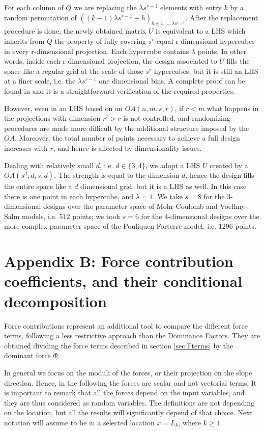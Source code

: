 \documentclass{article}
\begin{document}
For each column of $Q$ we are replacing the $\lambda s^{r-1}$ elements with entry $k$ by a random permutation of $\left((k-1)\lambda s^{r-1} + h\right)_{h\in 1,\dots, \lambda s^{r-1}}$. After the replacement procedure is done, the newly obtained matrix $U$ is equivalent to a LHS which inherits from $Q$ the property of fully covering $s^r$ equal r-dimensional hypercubes in every r-dimensional projection. Each hypercube contains $\lambda$ points. In other words, inside each r-dimensional projection, the design associated to $U$ fills the space like a regular grid at the scale of those $s^r$ hypercubes, but it is still an LHS at a finer scale, i.e. the $\lambda s^{r-1}$ one dimensional bins. A complete proof can be found in \cite{Tang1993} and it is a straightforward verification of the required properties.

However, even in an LHS based on an $OA(n,m,s,r)$, if $r<m$ what happens in the projections with dimension $r'>r$ is not controlled, and randomizing procedures are made more difficult by the additional structure imposed by the $OA$. Moreover, the total number of points necessary to achieve a full design increases with $r$, and hence is affected by dimensionality issues.

Dealing with relatively small $d$, i.e. $d\in\{3,4\}$, we adopt a LHS $U$ created by a $OA(s^d,d,s,d)$. The strength is equal to the dimension $d$, hence the design fills the entire space like a $d$ dimensional grid, but it is a LHS as well. In this case there is one point in each hypercube, and $\lambda=1$. We take $s=8$ for the 3-dimensional designs over the parameter space of Mohr-Coulomb and Voellmy-Salm models, i.e. $512$ points; we took $s=6$ for the 4-dimensional designs over the more complex parameter space of the Pouliquen-Forterre model, i.e. 1296 points.

\section{Appendix B: Force contribution coefficients, and their conditional decomposition}
Force contributions represent an additional tool to compare the different force terms, following a less restrictive approach than the Dominance Factors. They are obtained dividing the force terms described in section \ref{sec:Fterms} by the dominant force $\Phi$.

In general we focus on the moduli of the forces, or their projection on the slope direction. Hence, in the following the forces are scalar and not vectorial terms. It is important to remark that all the forces depend on the input variables, and they are thus considered as random variables. The definitions are not depending on the location, but all the results will significantly depend of that choice. Next notation will assume to be in a selected location $x=L_k$, where $k\ge 1$.
\end{document}

